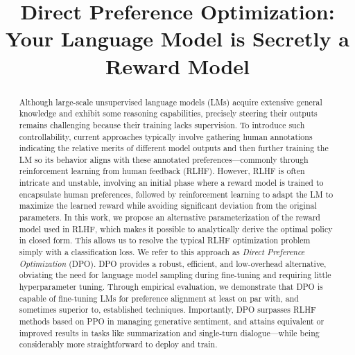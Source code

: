 \title{Direct Preference Optimization: Your Language Model is Secretly a Reward Model}

\begin{abstract}
Although large-scale unsupervised language models (LMs) acquire extensive general knowledge and exhibit some reasoning capabilities, precisely steering their outputs remains challenging because their training lacks supervision. To introduce such controllability, current approaches typically involve gathering human annotations indicating the relative merits of different model outputs and then further training the LM so its behavior aligns with these annotated preferences—commonly through reinforcement learning from human feedback (RLHF). However, RLHF is often intricate and unstable, involving an initial phase where a reward model is trained to encapsulate human preferences, followed by reinforcement learning to adapt the LM to maximize the learned reward while avoiding significant deviation from the original parameters. In this work, we propose an alternative parameterization of the reward model used in RLHF, which makes it possible to analytically derive the optimal policy in closed form. This allows us to resolve the typical RLHF optimization problem simply with a classification loss. We refer to this approach as \textit{Direct Preference Optimization} (DPO). DPO provides a robust, efficient, and low-overhead alternative, obviating the need for language model sampling during fine-tuning and requiring little hyperparameter tuning. Through empirical evaluation, we demonstrate that DPO is capable of fine-tuning LMs for preference alignment at least on par with, and sometimes superior to, established techniques. Importantly, DPO surpasses RLHF methods based on PPO in managing generative sentiment, and attains equivalent or improved results in tasks like summarization and single-turn dialogue—while being considerably more straightforward to deploy and train.
\end{abstract}

